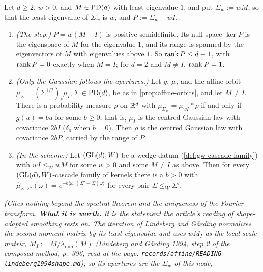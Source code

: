 \begin{proposition}
\label{prop:shape-adapted-apertures}
\leanok
Let $d \ge 2$, $w > 0$, and $M \in \mathrm{PD}(d)$ with least eigenvalue $1$, and put $\Sigma_w := wM$, so that
the least eigenvalue of $\Sigma_w$ is $w$, and $P := \Sigma_w - wI$.
\begin{enumerate}
\item \emph{(The step.)} $P = w(M - I)$ is positive semidefinite. Its null space $\ker P$ is the eigenspace of $M$ for
the eigenvalue $1$, and its range is spanned by the eigenvectors of $M$ with eigenvalues above $1$. So
$\operatorname{rank} P \le d - 1$, with $\operatorname{rank} P = 0$ exactly when $M = I$; for $d = 2$ and $M \ne I$, $\operatorname{rank} P = 1$.
\item \emph{(Only the Gaussian follows the apertures.)} Let $g$, $\mu_I$ and the affine orbit
$\mu_\Sigma = (\Sigma^{1/2})_*\mu_I$, $\Sigma \in \mathrm{PD}(d)$, be as in \ref{prop:affine-orbits}, and let
$M \ne I$. There is a probability measure $\rho$ on $\mathbb{R}^d$ with $\mu_{\Sigma_w} = \mu_{wI} * \rho$ if and
only if $g(u) = bu$ for some $b \ge 0$, that is, $\mu_I$ is the centred Gaussian law with covariance $2bI$
($\delta_0$ when $b = 0$). Then $\rho$ is the centred Gaussian law with covariance $2bP$, carried by the
range of $P$.
\item \emph{(In the scheme.)} Let $(\mathrm{GL}(d), W)$ be a wedge datum (\ref{def:gw-cascade-family}) with
$wI \le_W wM$ for some $w > 0$ and some $M \ne I$ as above. Then for every $(\mathrm{GL}(d), W)$-cascade family
of kernels there is a $b > 0$ with $\widehat\mu_{\Sigma,\Sigma'}(\omega) =
e^{-b\langle\omega,(\Sigma'-\Sigma)\omega\rangle}$ for every pair $\Sigma \le_W \Sigma'$.
\end{enumerate}
\statusT\quad\emph{(Cites nothing beyond the spectral theorem and the uniqueness of the Fourier
transform. \textbf{What it is worth.} It is the statement the article's reading of shape-adapted
smoothing rests on. The iteration of Lindeberg and Gårding normalizes the second-moment matrix by its
least eigenvalue and uses $wM_I$ as the local scale matrix, $M_I := M/\lambda_{\min}(M)$ (Lindeberg and
Gårding 1994, step 2 of the composed method, p.~396, read at the page:
\texttt{records/affine/READING-lindeberg1994shape.md}); so its apertures are the $\Sigma_w$ of this node,
}
\end{proposition}
